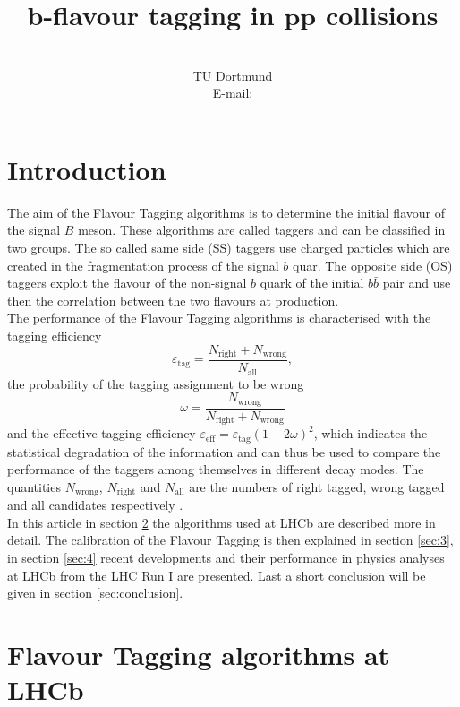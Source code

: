 \documentclass{PoS}
\title{$\bm{b}$-flavour tagging in $\bm{p\!p}$ collisions}
\author{\speaker{Alex Birnkraut}\\%
        TU Dortmund\\
        E-mail: \email{a.birnkraut@cern.ch}}
\begin{document}
\section{Introduction}\label{sec:1}

The aim of the Flavour Tagging algorithms is to determine the initial flavour of the signal $B$ meson. These algorithms are called taggers and can be classified in two groups. The so called same side (SS) taggers use charged particles which are created in the fragmentation process of the signal $b$ quar. The opposite side (OS) taggers exploit the flavour of the non-signal $b$ quark of the initial $b\bar{b}$ pair and use then the correlation between the two flavours at production.\\
The performance of the Flavour Tagging algorithms is characterised with the tagging efficiency
\begin{equation}
\varepsilon_\text{tag}=\frac{N_\text{right}+N_\text{wrong}}{N_\text{all}},
\end{equation}
the probability of the tagging assignment to be wrong
\begin{equation}
\omega=\frac{N_\text{wrong}}{N_\text{right}+N_\text{wrong}}
\end{equation}
and the effective tagging efficiency $\varepsilon_\text{eff}=\varepsilon_\text{tag}\left(1-2\omega\right)^2$, which indicates the statistical degradation of the information and can thus be used to compare the performance of the taggers among themselves in different decay modes. The quantities $N_\text{wrong}$, $N_\text{right}$ and $N_\text{all}$ are the numbers of right tagged, wrong tagged and all candidates respectively \cite{1}. \\
In this article in section \ref{sec:2} the algorithms used at LHCb are described more in detail. The calibration of the Flavour Tagging is then explained in section \ref{sec:3}, in section \ref{sec:4} recent developments and their performance in physics analyses at LHCb from the LHC Run I are presented. Last a short conclusion will be given in section \ref{sec:conclusion}.

\section{Flavour Tagging algorithms at LHCb}\label{sec:2}
\end{document}
